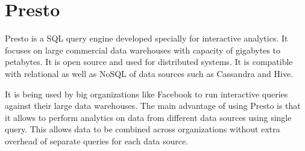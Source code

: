 \section{Presto}

Presto is a SQL query engine developed specially for interactive analytics. It
focuses on large commercial data warehouses with capacity of gigabytes to
petabytes. It is open source and used for distributed systems. It is compatible
with relational as well as NoSQL of data sources such as Cassandra and Hive.

It is being used by big organizations like Facebook to run interactive queries
against their large data warehouses. The main advantage of using Presto is that
it allows to perform analytics on data from different data sources using single
query. This allows data to be combined across organizations without extra
overhead of separate queries for each data source. \cite{hid-sp18-502-Presto}

